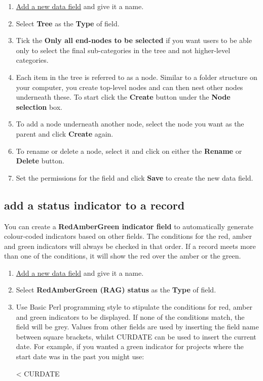 \documentclass{ctrlo-int-toc}
\begin{document}
\begin{admin}
\begin{enumerate}
\item \hyperref[subsec:addfield]{Add a new data field} and give it a name.
\item Select \textbf{Tree} as the \textbf{Type} of field. 
\item Tick the \textbf{Only all end-nodes to be selected} if you want users to be able only to select the final sub-categories in the tree and not higher-level categories.
\item Each item in the tree is referred to as a node. Similar to a folder structure on your computer, you create top-level nodes and can then nest other nodes underneath these. To start click the \textbf{Create} button under the \textbf{Node selection} box. 
\item To add a node underneath another node, select the node you want as the parent and click \textbf{Create} again.
\item To rename or delete a node, select it and click on either the \textbf{Rename} or \textbf{Delete} button. 
\item Set the permissions for the field and click \textbf{Save} to create the new data field. 
\end{enumerate}
\subsection[add a status indicator to a record ]{add a status indicator to a record }
\label{subsec:fieldrag}
You can create a \textbf{RedAmberGreen indicator field} to automatically generate colour-coded indicators based on other fields. The conditions for the red, amber and green indicators will always be checked in that order. If a record meets more than one of the conditions, it will show the red over the amber or the green. 

\begin{enumerate}
\item \hyperref[subsec:addfield]{Add a new data field} and give it a name.
\item Select \textbf{RedAmberGreen (RAG) status} as the \textbf{Type} of field. 
\item Use Basic Perl programming style to stipulate the conditions for red, amber and green indicators to be displayed. If none of the conditions match, the field will be grey. \newline
Values from other fields are used by inserting the field name between square brackets, whilst {\textquotedbl}CURDATE{\textquotedbl} can be used to insert the current date. \newline
For example, if you wanted a green indicator for projects where the start date was in the past you might use: 
\begin{code}
 {\textless} CURDATE\newline
\end{code}


\end{enumerate}
\end{admin}
\end{document}

